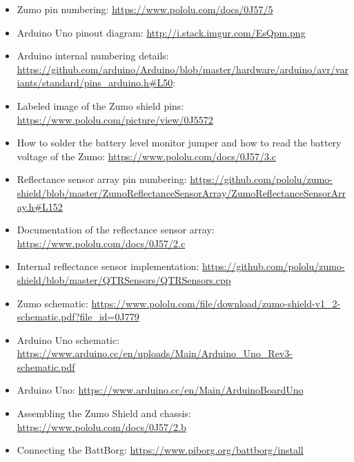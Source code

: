\documentclass{article}
\begin{document}
\begin{itemize}
  \item Zumo pin numbering: \url{https://www.pololu.com/docs/0J57/5}
  \item Arduino Uno pinout diagram: \url{http://i.stack.imgur.com/EsQpm.png}
  \item Arduino internal numbering details: 
        \url{https://github.com/arduino/Arduino/blob/master/hardware/arduino/avr/variants/standard/pins_arduino.h#L50}:
  \item Labeled image of the Zumo shield pins: 
        \url{https://www.pololu.com/picture/view/0J5572}
  \item How to solder the battery level monitor jumper and how to read the 
        battery voltage of the Zumo: 
        \url{https://www.pololu.com/docs/0J57/3.c}
  \item Reflectance sensor array pin numbering: 
        \url{https://github.com/pololu/zumo-shield/blob/master/ZumoReflectanceSensorArray/ZumoReflectanceSensorArray.h#L152}
  \item Documentation of the reflectance sensor array: 
        \url{https://www.pololu.com/docs/0J57/2.c}
  \item Internal reflectance sensor implementation: 
        \url{https://github.com/pololu/zumo-shield/blob/master/QTRSensors/QTRSensors.cpp}
  \item Zumo schematic: 
        \url{https://www.pololu.com/file/download/zumo-shield-v1_2-schematic.pdf?file_id=0J779}
  \item Arduino Uno schematic: 
        \url{https://www.arduino.cc/en/uploads/Main/Arduino_Uno_Rev3-schematic.pdf}
  \item Arduino Uno: \url{https://www.arduino.cc/en/Main/ArduinoBoardUno}
  \item Assembling the Zumo Shield and chassis: 
        \url{https://www.pololu.com/docs/0J57/2.b}
  \item Connecting the BattBorg: \url{https://www.piborg.org/battborg/install}
\end{itemize}
\end{document}
